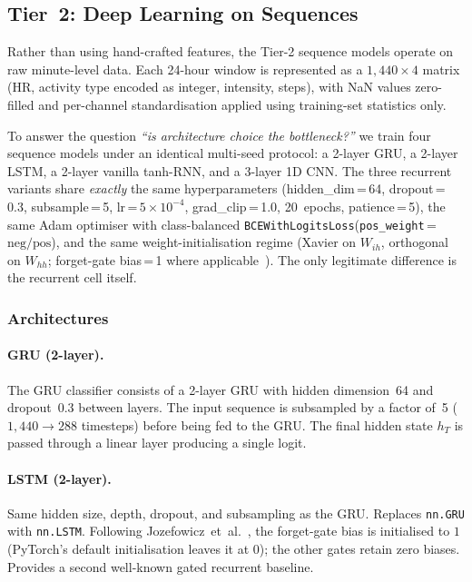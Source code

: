 \documentclass[11pt,a4paper]{article}
\begin{document}
\subsection{Tier~2: Deep Learning on Sequences}\label{sec:deep}

Rather than using hand-crafted features, the Tier-2 sequence models operate
on raw minute-level data.  Each 24-hour window is represented as a
$1{,}440 \times 4$ matrix (HR, activity type encoded as integer, intensity,
steps), with NaN values zero-filled and per-channel standardisation applied
using training-set statistics only.

To answer the question \emph{``is architecture choice the bottleneck?''} we
train four sequence models under an identical multi-seed protocol: a
2-layer GRU, a 2-layer LSTM, a 2-layer vanilla tanh-RNN, and a 3-layer 1D
CNN.  The three recurrent variants share \emph{exactly} the same
hyperparameters (hidden\_dim\,=\,64, dropout\,=\,0.3, subsample\,=\,5,
lr\,=\,$5\!\times\!10^{-4}$, grad\_clip\,=\,1.0, 20~epochs, patience\,=\,5),
the same Adam optimiser with class-balanced
\texttt{BCEWithLogitsLoss}(\texttt{pos\_weight}\,=\,$\text{neg}/\text{pos}$),
and the same weight-initialisation regime (Xavier on
$W_{ih}$, orthogonal on $W_{hh}$; forget-gate bias\,=\,1 where
applicable~\cite{jozefowicz2015}).  The only legitimate difference is the
recurrent cell itself.

\subsubsection{Architectures}\label{sec:tier2-archs}

\paragraph{GRU (2-layer).}
The GRU classifier consists of a 2-layer GRU with hidden dimension~64 and
dropout~0.3 between layers.  The input sequence is subsampled by a factor
of~5 ($1{,}440 \to 288$ timesteps) before being fed to the GRU.  The final
hidden state $h_T$ is passed through a linear layer producing a single
logit.

\paragraph{LSTM (2-layer).}
Same hidden size, depth, dropout, and subsampling as the GRU.  Replaces
\texttt{nn.GRU} with \texttt{nn.LSTM}.  Following
Jozefowicz~et~al.~\cite{jozefowicz2015}, the forget-gate bias is
initialised to $1$ (PyTorch's default initialisation leaves it at $0$); the
other gates retain zero biases.  Provides a second well-known gated
recurrent baseline.
\end{document}
